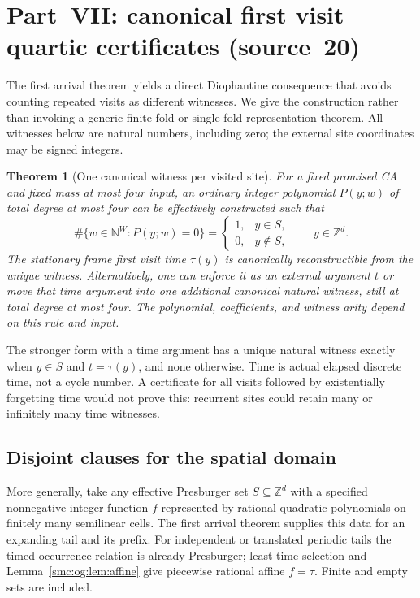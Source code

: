 \documentclass[11pt,letterpaper]{article}
\numberwithin{equation}{section}
\newtheorem{theorem}{Theorem}[section]
\theoremstyle{definition}
\theoremstyle{remark}
\newcommand{\Z}{\mathbb Z}
\newcommand{\NN}{\mathbb N}
\begin{document}
\section{Part~VII: canonical first visit quartic certificates (source~20)}\label{smc:og:app:quartic}
The first arrival theorem yields a direct Diophantine consequence that avoids counting repeated visits as different witnesses. We give the construction rather than invoking a generic finite fold or single fold representation theorem. All witnesses below are natural numbers, including zero; the external site coordinates may be signed integers.

\begin{theorem}[One canonical witness per visited site]\label{smc:og:thm:quartic}
For a fixed promised CA and fixed mass at most four input, an ordinary integer polynomial $P(y;w)$ of total degree at most four can be effectively constructed such that
\[
 \#\{w\in\NN^W:P(y;w)=0\}=
 \begin{cases}1,&y\in S,\\0,&y\notin S,\end{cases}
 \qquad y\in\Z^d.
\]
The stationary frame first visit time $\tau(y)$ is canonically reconstructible from the unique witness. Alternatively, one can enforce it as an external argument $t$ or move that time argument into one additional canonical natural witness, still at total degree at most four. The polynomial, coefficients, and witness arity depend on this rule and input.
\end{theorem}
The stronger form with a time argument has a unique natural witness exactly when $y\in S$ and $t=\tau(y)$, and none otherwise. Time is actual elapsed discrete time, not a cycle number. A certificate for all visits followed by existentially forgetting time would not prove this: recurrent sites could retain many or infinitely many time witnesses.

\subsection{Disjoint clauses for the spatial domain}
More generally, take any effective Presburger set $S\subseteq\Z^d$ with a specified nonnegative integer function $f$ represented by rational quadratic polynomials on finitely many semilinear cells. The first arrival theorem supplies this data for an expanding tail and its prefix. For independent or translated periodic tails the timed occurrence relation is already Presburger; least time selection and Lemma~\ref{smc:og:lem:affine} give piecewise rational affine $f=\tau$. Finite and empty sets are included.
\end{document}
